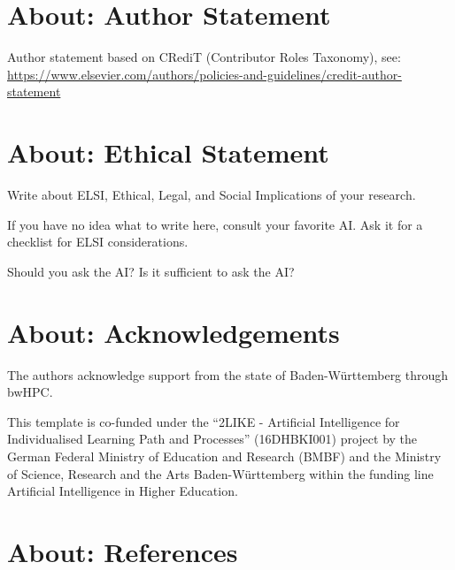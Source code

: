 \documentclass[manuscript, nonacm]{acmart}
\begin{document}
\section{About: Author Statement}


Author statement based on CRediT (Contributor Roles Taxonomy), see: \url{https://www.elsevier.com/authors/policies-and-guidelines/credit-author-statement}


\section{About: Ethical Statement}

Write about ELSI, \ie Ethical, Legal, and Social Implications of your research.

\begin{tcolorbox}[title=Instructions: How to write an ELSI statement?]
If you have no idea what to write here, consult your favorite AI. Ask it for a checklist for ELSI considerations. 

Should you ask the AI?
Is it sufficient to ask the AI?
\end{tcolorbox}

\section{About: Acknowledgements}

\begin{acks}

The authors acknowledge support from the state of Baden-Württemberg through bwHPC.

This template is co-funded under the ``2LIKE - Artificial Intelligence for Individualised Learning Path and Processes'' (16DHBKI001)  project by the German Federal Ministry of Education and Research (BMBF) and the Ministry of Science, Research and the Arts Baden-Württemberg within the funding line Artificial Intelligence in Higher Education. 

\mysupervisorrole


\end{acks}


\section{About: References}
\end{document}
